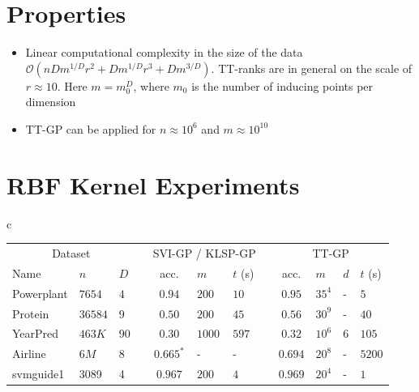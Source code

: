 \documentclass[a0,portrait]{a0poster}
\newcommand{\bigO}{\mathcal{O}}
\begin{document}
\begin{multicols}{2}
\section*{\LARGE \color{NavyBlue} Properties}
    
\begin{itemize}
  \item Linear computational complexity in the size of the data
    $\bigO(n D m^{1 / D} r^2 + D m^{1 / D} r^3 + D m^{3 / D})$. 
    TT-ranks are in general on the scale of $r \approx 10$.
    Here $m = m_0^D$, where $m_0$ is the number of inducing points per
    dimension
  \item TT-GP can be applied for $n \approx 10^6$ and $m \approx 10^{10}$
\end{itemize}

\section*{\LARGE \color{NavyBlue} RBF Kernel Experiments}

\begin{tabular}{c}
  \begin{tabular}{lll l cll l clll}
    \toprule
    \multicolumn{3}{c}{Dataset} && \multicolumn{3}{c}{SVI-GP / KLSP-GP} && \multicolumn{4}{c}{TT-GP} \\
    \cmidrule{1-3}
    \cmidrule{5-7}
    \cmidrule{9-12}

    Name & $n$ & $D$ &&
    acc. & $m$ & $t$ (s) &&
    acc. & $m$ & $d$ & $t$ (s)\\
    \midrule

    Powerplant & $7654$ & $4$ &&
    $0.94$ & $200$ & $10$ &&
    $\mathbf{0.95}$ & $35^4$ & - & $5$ \\

    Protein & $36584$ & $9$ &&
    $0.50$ & $200$ & $45$ &&
    $\mathbf{0.56}$ & $30^9$ & - & $40$ \\

    YearPred & $463K$ & $90$ &&
    $0.30$ & $1000$ & $597$ &&
    $\mathbf{0.32}$ & $10^6$ & $6$ & $105$ \\

    \midrule
    Airline & $6M$ & $8$ &&
    $0.665^*$ & - & - &&
    $\mathbf{0.694}$ & $20^8$ & - & $5200$ \\

    svmguide1 & 3089 & 4 &&
    $0.967$ & $200$ & $4$ &&
    $\mathbf{0.969}$ & $20^4$ & - & $1$\\


\end{tabular}
\end{tabular}
\end{multicols}
\end{document}

